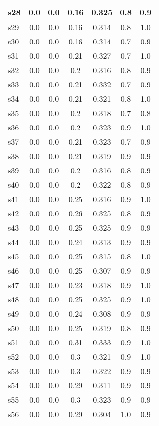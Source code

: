 \documentclass{article}
\begin{document}
\begin{tabular}{|l|c|c|c|c|c|c|}
\hline
s28 &0.0 & 0.0 & 0.16 & 0.325 & 0.8 & 0.9\\
\hline
s29 &0.0 & 0.0 & 0.16 & 0.314 & 0.8 & 1.0\\
\hline
s30 &0.0 & 0.0 & 0.16 & 0.314 & 0.7 & 0.9\\
\hline
s31 &0.0 & 0.0 & 0.21 & 0.327 & 0.7 & 1.0\\
\hline
s32 &0.0 & 0.0 & 0.2 & 0.316 & 0.8 & 0.9\\
\hline
s33 &0.0 & 0.0 & 0.21 & 0.332 & 0.7 & 0.9\\
\hline
s34 &0.0 & 0.0 & 0.21 & 0.321 & 0.8 & 1.0\\
\hline
s35 &0.0 & 0.0 & 0.2 & 0.318 & 0.7 & 0.8\\
\hline
s36 &0.0 & 0.0 & 0.2 & 0.323 & 0.9 & 1.0\\
\hline
s37 &0.0 & 0.0 & 0.21 & 0.323 & 0.7 & 0.9\\
\hline
s38 &0.0 & 0.0 & 0.21 & 0.319 & 0.9 & 0.9\\
\hline
s39 &0.0 & 0.0 & 0.2 & 0.316 & 0.8 & 0.9\\
\hline
s40 &0.0 & 0.0 & 0.2 & 0.322 & 0.8 & 0.9\\
\hline
s41 &0.0 & 0.0 & 0.25 & 0.316 & 0.9 & 1.0\\
\hline
s42 &0.0 & 0.0 & 0.26 & 0.325 & 0.8 & 0.9\\
\hline
s43 &0.0 & 0.0 & 0.25 & 0.325 & 0.9 & 0.9\\
\hline
s44 &0.0 & 0.0 & 0.24 & 0.313 & 0.9 & 0.9\\
\hline
s45 &0.0 & 0.0 & 0.25 & 0.315 & 0.8 & 1.0\\
\hline
s46 &0.0 & 0.0 & 0.25 & 0.307 & 0.9 & 0.9\\
\hline
s47 &0.0 & 0.0 & 0.23 & 0.318 & 0.9 & 1.0\\
\hline
s48 &0.0 & 0.0 & 0.25 & 0.325 & 0.9 & 1.0\\
\hline
s49 &0.0 & 0.0 & 0.24 & 0.308 & 0.9 & 0.9\\
\hline
s50 &0.0 & 0.0 & 0.25 & 0.319 & 0.8 & 0.9\\
\hline
s51 &0.0 & 0.0 & 0.31 & 0.333 & 0.9 & 1.0\\
\hline
s52 &0.0 & 0.0 & 0.3 & 0.321 & 0.9 & 1.0\\
\hline
s53 &0.0 & 0.0 & 0.3 & 0.322 & 0.9 & 0.9\\
\hline
s54 &0.0 & 0.0 & 0.29 & 0.311 & 0.9 & 0.9\\
\hline
s55 &0.0 & 0.0 & 0.3 & 0.323 & 0.9 & 0.9\\
\hline
s56 &0.0 & 0.0 & 0.29 & 0.304 & 1.0 & 0.9\\

\end{tabular}
\end{document}

